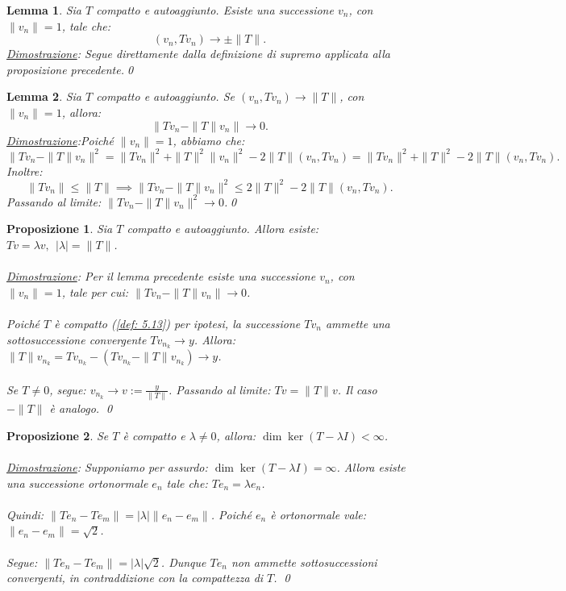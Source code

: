 \documentclass[a4paper,12pt]{report}
\newtheorem{proposizione}{Proposizione}[chapter]
\newtheorem{lemma}{Lemma}[chapter]
\begin{document}
\newpage

\begin{lemma}\label{lem: 5.1}
Sia $T$ compatto e autoaggiunto. Esiste una successione $v_n$, con $\|v_n\|=1$, tale che:
\[
(v_n,Tv_n)\to \pm\|T\|.
\]
\underline{Dimostrazione}: Segue direttamente dalla definizione di supremo applicata alla proposizione precedente.\qed
\end{lemma}
\vspace{0.5cm}
\begin{lemma}\label{lemm: 5.2}
Sia $T$ compatto e autoaggiunto. Se $(v_n,Tv_n)\to\|T\|$, con $\|v_n\|=1$, allora:
\[
\|Tv_n-\|T\|v_n\|\to0.
\]
\underline{Dimostrazione}:Poiché $\|v_n\|=1$, abbiamo che:
\[
\|Tv_n-\|T\|v_n\|^2
=
\|Tv_n\|^2
+
\|T\|^2\|v_n\|^2
-
2\|T\|(v_n,Tv_n)=
\|Tv_n\|^2+\|T\|^2-2\|T\|(v_n,Tv_n).
\]
Inoltre:
\[
\|Tv_n\|
\le
\|T\|\implies 
\|Tv_n-\|T\|v_n\|^2
\le
2\|T\|^2-2\|T\|(v_n,Tv_n).
\]
Passando al limite: $\|Tv_n-\|T\|v_n\|^2\to0$.\qed

\end{lemma}
\vspace{0.5cm}
\begin{proposizione}\label{prop: 5.5}
Sia $T$ compatto e autoaggiunto. Allora esiste: $Tv=\lambda v, \ \
|\lambda|=\|T\|$.
\\
\\\underline{Dimostrazione}: Per il lemma precedente esiste una successione $v_n$, con $\|v_n\|=1$, tale per cui: $\|Tv_n-\|T\|v_n\|\to0$.
\\
\\Poiché $T$ è compatto (\ref{def: 5.13}) per ipotesi, la successione $Tv_n$ ammette una sottosuccessione convergente
$Tv_{n_k}\to y$. Allora: $\|T\|v_{n_k}
=
Tv_{n_k}-(Tv_{n_k}-\|T\|v_{n_k})
\to y$.
\\
\\Se $T\neq0$, segue: $v_{n_k}\to v:=\frac y{\|T\|}$. Passando al limite: $Tv=\|T\|v$. Il caso $-\|T\|$ è analogo. \qed
\end{proposizione}
\vspace{0.5cm}
\begin{proposizione}\label{prop: 5.6}
Se $T$ è compatto e $\lambda\neq0$, allora: $\dim\ker(T-\lambda I)<\infty$.
\\
\\\underline{Dimostrazione}: Supponiamo per assurdo: $\dim\ker(T-\lambda I)=\infty$. Allora esiste una successione ortonormale $e_n$ tale che: $Te_n=\lambda e_n$.
\\
\\Quindi: $\|Te_n-Te_m\|
=
|\lambda|\|e_n-e_m\|$. Poiché $e_n$ è ortonormale vale: $\|e_n-e_m\|=\sqrt2$.
\\
\\Segue:
$\|Te_n-Te_m\|
=
|\lambda|\sqrt2$. Dunque $Te_n$ non ammette sottosuccessioni convergenti, in contraddizione con la compattezza di $T$. \qed
\end{proposizione}
\end{document}
